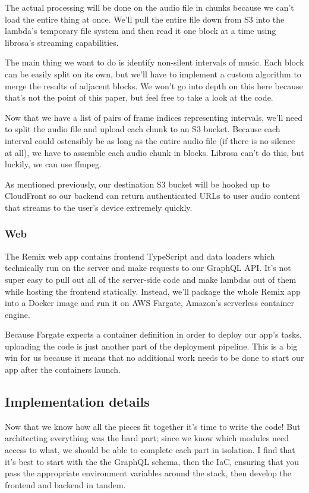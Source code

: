 \documentclass{article}
\begin{document}
The actual processing will be done on the audio file in chunks because we can't load the entire thing at once.
We'll pull the entire file down from S3 into the lambda's temporary file system and then read it one block at a time using librosa's streaming capabilities.

The main thing we want to do is identify non-silent intervals of music.
Each block can be easily split on its own, but we'll have to implement a custom algorithm to merge the results of adjacent blocks.
We won't go into depth on this here because that's not the point of this paper, but feel free to take a look at the code.

Now that we have a list of pairs of frame indices representing intervals, we'll need to split the audio file and upload each chunk to an S3 bucket.
Because each interval could ostensibly be as long as the entire audio file (if there is no silence at all), we have to assemble each audio chunk in blocks.
Librosa can't do this, but luckily, we can use ffmpeg.

As mentioned previously, our destination S3 bucket will be hooked up to CloudFront so our backend can return authenticated URLs to user audio content that streams to the user's device extremely quickly.

\subsubsection{Web}

The Remix web app contains frontend TypeScript and data loaders which technically run on the server and make requests to our GraphQL API.
It's not super easy to pull out all of the server-side code and make lambdas out of them while hosting the frontend statically.
Instead, we'll package the whole Remix app into a Docker image and run it on AWS Fargate, Amazon's serverless container engine.

Because Fargate expects a container definition in order to deploy our app's tasks, uploading the code is just another part of the deployment pipeline.
This is a big win for us because it means that no additional work needs to be done to start our app after the containers launch.

\subsection{Implementation details}

Now that we know how all the pieces fit together it's time to write the code!
But architecting everything was the hard part; since we know which modules need access to what, we should be able to complete each part in isolation.
I find that it's best to start with the the GraphQL schema, then the IaC, ensuring that you pass the appropriate environment variables around the stack, then develop the frontend and backend in tandem.
\end{document}
